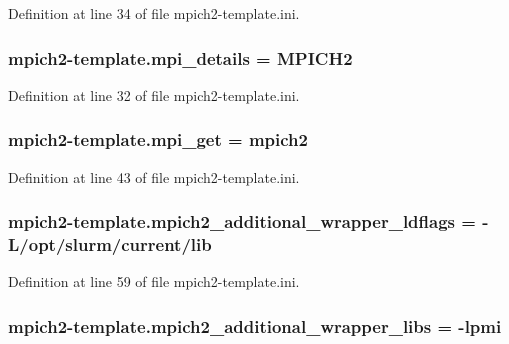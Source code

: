 Definition at line 34 of file mpich2-\/template.\-ini.

\hypertarget{namespacempich2-template_a6b1b1f5d25476fbca270d0985d661274}{
\subsubsection[{mpi\-\_\-details}]{\setlength{\rightskip}{0pt plus 5cm}mpich2-\/template.\-mpi\-\_\-details = M\-P\-I\-C\-H2}}\label{namespacempich2-template_a6b1b1f5d25476fbca270d0985d661274}


Definition at line 32 of file mpich2-\/template.\-ini.

\hypertarget{namespacempich2-template_adbf06848cfab6ca7c02c6403132c0139}{
\subsubsection[{mpi\-\_\-get}]{\setlength{\rightskip}{0pt plus 5cm}mpich2-\/template.\-mpi\-\_\-get = mpich2}}\label{namespacempich2-template_adbf06848cfab6ca7c02c6403132c0139}


Definition at line 43 of file mpich2-\/template.\-ini.

\hypertarget{namespacempich2-template_ae2865f33a6b3ae966c6e7b785d0553b5}{
\subsubsection[{mpich2\-\_\-additional\-\_\-wrapper\-\_\-ldflags}]{\setlength{\rightskip}{0pt plus 5cm}mpich2-\/template.\-mpich2\-\_\-additional\-\_\-wrapper\-\_\-ldflags = -\/L/opt/slurm/current/lib}}\label{namespacempich2-template_ae2865f33a6b3ae966c6e7b785d0553b5}


Definition at line 59 of file mpich2-\/template.\-ini.

\hypertarget{namespacempich2-template_a93955bb1c58ee54b6ec759ce3ec7ab05}{
\subsubsection[{mpich2\-\_\-additional\-\_\-wrapper\-\_\-libs}]{\setlength{\rightskip}{0pt plus 5cm}mpich2-\/template.\-mpich2\-\_\-additional\-\_\-wrapper\-\_\-libs = -\/lpmi}}\label{namespacempich2-template_a93955bb1c58ee54b6ec759ce3ec7ab05}


